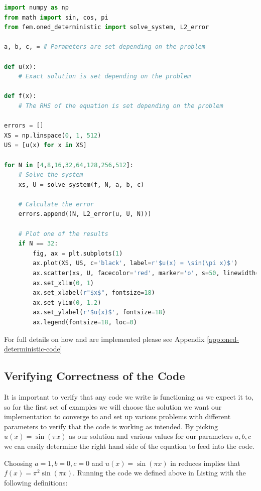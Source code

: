 \begin{lstlisting}[caption={Setup code for the Finite Element Method
                            Implementation},
                   label={code:oned-deterministic},
                   language=Python]
import numpy as np
from math import sin, cos, pi
from fem.oned_deterministic import solve_system, L2_error

a, b, c, = # Parameters are set depending on the problem

def u(x):
    # Exact solution is set depending on the problem

def f(x):
    # The RHS of the equation is set depending on the problem

errors = []
XS = np.linspace(0, 1, 512)
US = [u(x) for x in XS]

for N in [4,8,16,32,64,128,256,512]:
    # Solve the system
    xs, U = solve_system(f, N, a, b, c)

    # Calculate the error
    errors.append((N, L2_error(u, U, N)))

    # Plot one of the results
    if N == 32:
        fig, ax = plt.subplots(1)
        ax.plot(XS, US, c='black', label=r'$u(x) = \sin(\pi x)$')
        ax.scatter(xs, U, facecolor='red', marker='o', s=50, linewidth=0, label=r'$u^h(x)$', alpha=1)
        ax.set_xlim(0, 1)
        ax.set_xlabel(r"$x$", fontsize=18)
        ax.set_ylim(0, 1.2)
        ax.set_ylabel(r'$u(x)$', fontsize=18)
        ax.legend(fontsize=18, loc=0)
\end{lstlisting}

For full details on how  and  are
implemented please see Appendix \ref{app:oned-deterministic-code}

\subsection{Verifying Correctness of the Code}

It is important to verify that any code we write is functioning as we expect it
to, so for the first set of examples we will choose the solution we want our
implementation to converge to and set up various problems with different
parameters to verify that the code is working as intended. By picking $u(x) =
\sin{(\pi x)}$ as our solution and various values for our parameters $a,b,c$ we
can easily determine the right hand side of the equation to feed into the code.

Choosing $a = 1, b = 0, c = 0$ and $u(x) = \sin{(\pi x)}$
in  reduces implies that
$f(x) = \pi^2\sin{(\pi x)}$. Running the code we defined above in
Listing  with the following definitions:

